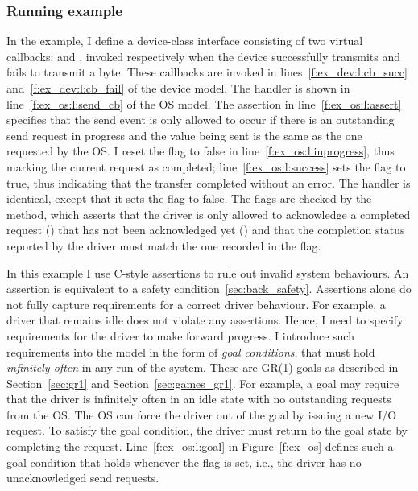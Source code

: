 \subsubsection{Running example}

In the example, I define a device-class interface consisting of two virtual callbacks:  and , invoked respectively when the device successfully transmits and fails to transmit a byte.  These callbacks are invoked in lines~\ref{f:ex_dev:l:cb_succ} and~\ref{f:ex_dev:l:cb_fail} of the device model.  The  handler is shown in line~\ref{f:ex_os:l:send_cb} of the OS model.  The assertion in line~\ref{f:ex_os:l:assert} specifies that the send event is only allowed to occur if there is an outstanding send request in progress and the value being sent is the same as the one requested by the OS\@.  I reset the  flag to false in line~\ref{f:ex_os:l:inprogress}, thus marking the current request as completed; line~\ref{f:ex_os:l:success} sets the  flag to true, thus indicating that the transfer completed without an error.  The  handler is identical, except that it sets the  flag to false.  The flags are checked by the  method, which asserts that the driver is only allowed to acknowledge a completed request () that has not been acknowledged yet () and that the completion status reported by the driver must match the one recorded in the  flag.

In this example I use C-style assertions to rule out invalid system behaviours.  An assertion is equivalent to a safety condition~\ref{sec:back_safety}. Assertions alone do not fully capture requirements for a correct driver behaviour. For example, a driver that remains idle does not violate any assertions. Hence, I need to specify requirements for the driver to make forward progress.  I introduce such requirements into the model in the form of \emph{goal conditions}, that must hold \emph{infinitely often} in any run of the system.  These are GR(1) goals as described in Section~\ref{sec:gr1} and Section~\ref{sec:games_gr1}. For example, a goal may require that the driver is infinitely often in an idle state with no outstanding requests from the OS\@.  The OS can force the driver out of the goal by issuing a new I/O request.  To satisfy the goal condition, the driver must return to the goal state by completing the request.  Line~\ref{f:ex_os:l:goal} in Figure~\ref{f:ex_os} defines such a goal condition that holds whenever the  flag is set, i.e., the driver has no unacknowledged send requests.

